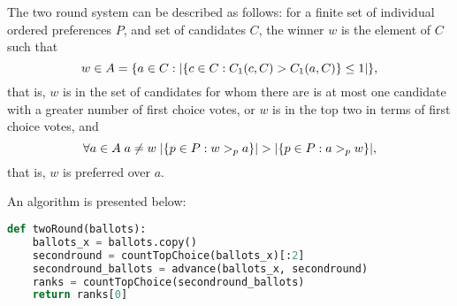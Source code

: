 \documentclass{article}
\begin{document}
The two round system can be described as follows: for a finite set of individual ordered preferences $P$, and set of candidates $C$, the winner $w$ is the element of $C$ such that
$$ w\in A = \qty{a\in C  :  \abs{\qty{c\in C: C_1(c, C) > C_1(a, C)} \leq 1}}, $$
that is, $w$ is in the set of candidates for whom there are is at most one candidate with a greater number of first choice votes, or $w$ is in the top two in terms of first choice votes, and
$$ \forall a \in A \; a \neq w \; \abs{\qty{p\in P : w >_p a}} > \abs{\qty{p\in P : a >_p w}}, $$
that is, $w$ is preferred over $a$.

An algorithm is presented below:
\begin{lstlisting}[language = Python]
def twoRound(ballots):
    ballots_x = ballots.copy()
    secondround = countTopChoice(ballots_x)[:2]
    secondround_ballots = advance(ballots_x, secondround)
    ranks = countTopChoice(secondround_ballots)
    return ranks[0]
\end{lstlisting}
\end{document}
